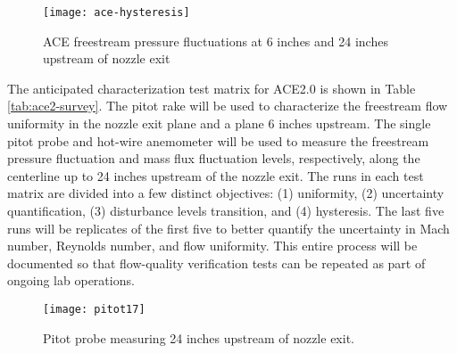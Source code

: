 \begin{figure}[ht!]
    \centering
    \texttt{[image: ace-hysteresis]}
    \caption{ACE freestream pressure fluctuations at 6 inches and 24 inches upstream of nozzle exit}
    \label{fig:ace-hysteresis}
\end{figure}

The anticipated characterization test matrix for ACE2.0 is shown in Table \ref{tab:ace2-survey}. The pitot rake will be used to characterize the freestream flow uniformity in the nozzle exit plane and a plane 6 inches upstream. The single pitot probe and hot-wire anemometer will be used to measure the freestream pressure fluctuation and mass flux fluctuation levels, respectively, along the centerline up to 24 inches upstream of the nozzle exit. The runs in each test matrix are divided into a few distinct objectives: (1) uniformity, (2) uncertainty quantification, (3) disturbance levels transition, and (4) hysteresis. The last five runs will be replicates of the first five to better quantify the uncertainty in Mach number, Reynolds number, and flow uniformity. This entire process will be documented so that flow-quality verification tests can be repeated as part of ongoing lab operations.

\begin{figure}[ht!]
    \centering
    \texttt{[image: pitot17]}
    \caption{Pitot probe measuring 24 inches upstream of nozzle exit.}
    \label{fig:pitot17}
\end{figure}

